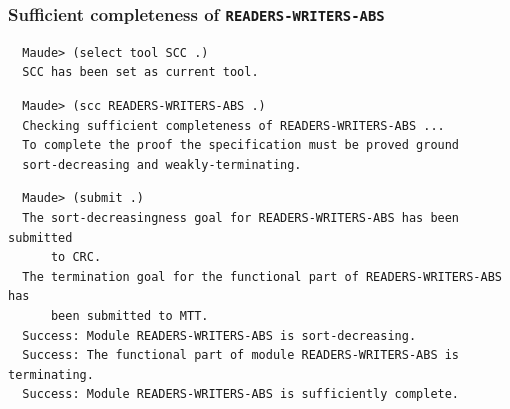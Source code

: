 \documentclass[xcolor=dvipsnames,10pt]{beamer}
\begin{document}
\begin{frame}[fragile]
  \frametitle{Sufficient completeness of \verb~READERS-WRITERS-ABS~}

\begin{scriptsize}
\begin{verbatim}
  Maude> (select tool SCC .)
  SCC has been set as current tool.
\end{verbatim}
\end{scriptsize}

\begin{scriptsize}
\begin{verbatim}
  Maude> (scc READERS-WRITERS-ABS .)
  Checking sufficient completeness of READERS-WRITERS-ABS ...
  To complete the proof the specification must be proved ground 
  sort-decreasing and weakly-terminating.
\end{verbatim}
\end{scriptsize}

\begin{scriptsize}
\begin{verbatim}
  Maude> (submit .)
  The sort-decreasingness goal for READERS-WRITERS-ABS has been submitted 
      to CRC.
  The termination goal for the functional part of READERS-WRITERS-ABS has      
      been submitted to MTT.
  Success: Module READERS-WRITERS-ABS is sort-decreasing.
  Success: The functional part of module READERS-WRITERS-ABS is terminating.
  Success: Module READERS-WRITERS-ABS is sufficiently complete.
\end{verbatim}
\end{scriptsize}

\end{frame}
\end{document}
